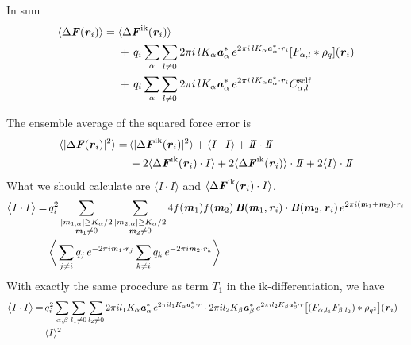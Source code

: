 \documentclass[aps,pre,preprint]{revtex4}
\renewcommand{\v}[1]{\textbf{\textit{#1}}}
\begin{document}
In sum
\begin{align} \nonumber
  \langle \Delta\v F(\v r_i)\rangle
  =\;&
  \langle \Delta\v F^{\textrm{ik}}(\v r_i)\rangle\\\nonumber
  &+\,
  q_i\sum_{\alpha}\sum_{l\neq 0}
  2\pi i\,l K_\alpha\v a_\alpha^\ast\,e^{2\pi i\,l K_\alpha\v a^\ast_\alpha\cdot \v r_i}
  [F_{\alpha,l}\ast\rho_q](\v r_i) \\
  &+\,
  q_i\sum_{\alpha}\sum_{l\neq 0}
  2\pi i\,l K_\alpha\v a_\alpha^\ast\,e^{2\pi i\,l K_\alpha\v a^\ast_\alpha\cdot \v r_i}
  C_{\alpha,l}^{\textrm{self}}
\end{align}

The ensemble average of the squared force error is
\begin{align}\nonumber
  \langle\vert \Delta\v F(\v r_i) \vert^2\rangle
  = &\,
  \langle\vert \Delta\v F^{\textrm{ik}}(\v r_i) \vert^2\rangle
  + \langle I\cdot I\rangle
  + I\negthickspace I\cdot I\negthickspace I\\
  &\,
  + 2\langle\Delta\v F^{\textrm{ik}}(\v r_i)\cdot I\rangle
  + 2\langle\Delta\v F^{\textrm{ik}}(\v r_i)\rangle\cdot I\negthickspace I
  + 2\langle I\rangle\cdot I\negthickspace I
\end{align}
What we should calculate are $\langle I\cdot I\rangle$ and
$\langle\Delta\v F^{\textrm{ik}}(\v r_i)\cdot I\rangle$.
\begin{align}\nonumber
  \big\langle
  I\cdot I
  \big\rangle
  = \,&
  q^2_i
  \sum_{
    \begin{subarray}{c}
      \vert m_{1,\alpha}\vert \geq K_\alpha/2\\
      \v m_1\neq 0
    \end{subarray}}
  \sum_{
    \begin{subarray}{c}
      \vert m_{2,\alpha}\vert \geq K_\alpha/2\\
      \v m_2\neq 0
    \end{subarray}}
  4 f(\v m_1)f(\v m_2) \,
  \v B(\v m_1, \v r_i)\cdot\v B(\v m_2, \v r_i)
  \,e^{2\pi i(\v m_1 + \v m_2)\cdot\v r_i} \\ 
  &
  \bigg\langle
  \sum_{j\neq i}q_j\,e^{-2\pi i\v m_1\cdot\v r_j}  
  \sum_{k\neq i}q_k\,e^{-2\pi i\v m_2\cdot\v r_k}
  \bigg\rangle
\end{align}
With exactly the same procedure as term $T_1$ in the
ik-differentiation, we have
\begin{align}\nonumber
  \big\langle
  I\cdot I
  \big\rangle
  = &\, 
  q_i^2
  \sum_{\alpha, \beta}\sum_{l_1\neq 0}\sum_{l_2\neq 0}
  2\pi i l_1K_\alpha\v a_\alpha^\ast\,e^{2\pi i l_1 K_\alpha\v a_\alpha^\ast\cdot r}
  \cdot
  2\pi i l_2K_\beta \v a_\beta ^\ast\,e^{2\pi i l_2 K_\beta \v a_\beta^\ast\cdot r}
  \big[
  (F_{\alpha,l_1} F_{\beta,l_2})
  \ast \rho_{q^2}
  \big]
  (\v r_i) + \\
  &\,
  \langle I\rangle^2
\end{align}
\end{document}
